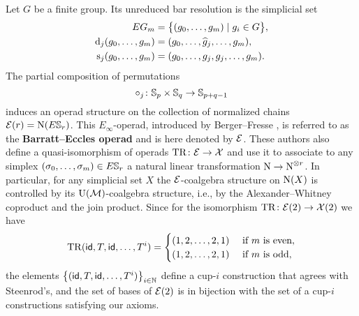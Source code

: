 Let $G$ be a finite group.
Its unreduced bar resolution is the simplicial set
\[
\begin{split}
EG_m &= \big\{ (g_0, \dots, g_m) \mid g_i \in G \big\}, \\
\operatorname{d}_j(g_0, \dots, g_m) &= (g_0, \dots, \widehat g_j, \dots, g_m), \\
\operatorname{s}_j(g_0, \dots, g_m) &= (g_0, \dots, g_j, g_j, \dots, g_m).
\end{split}
\]
The partial composition of permutations
\[
\circ_j \colon \mathbb{S}_p \times \mathbb{S}_q \to \mathbb{S}_{p+q-1}
\]
induces an operad structure on the collection of normalized chains $\mathcal{E}(r) = \operatorname{N}(E \mathbb{S}_r)$.
This $E_\infty$-operad, introduced by Berger--Fresse \cite{berger2004combinatorial}, is referred to as the \textbf{Barratt--Eccles operad} and is here denoted by $\mathcal{E}$.
These authors also define a quasi-isomorphism of operads $\mathrm{TR} \colon \mathcal{E} \to \mathcal{X}$ and use it to associate to any simplex $(\sigma_0, \dots, \sigma_m) \in E \mathbb{S}_r$ a natural linear transformation $\operatorname{N} \to \operatorname{N}^{\otimes r}$.
In particular, for any simplicial set $X$ the $\mathcal{E}$-coalgebra structure on $\operatorname{N}(X)$ is controlled by its ${\operatorname{U}(\mathcal{M})}$-coalgebra structure, i.e., by the Alexander--Whitney coproduct and the join product.
Since for the isomorphism $\mathrm{TR} \colon \mathcal{E}(2) \to \mathcal{X}(2)$ we have
\[
\mathrm{TR}(\mathsf{id}, T, \mathsf{id}, \dots, T^i) =
\begin{cases}
(1,2,\dots,2,1) & \text{ if } m \text{ is even}, \\
(1,2,\dots,2,1) & \text{ if } m \text{ is odd},
\end{cases}
\]
the elements $\big\{ (\mathsf{id}, T, \mathsf{id}, \dots, T^i) \big\}_{i \in \mathbb{N}}$ define a \mbox{cup-$i$} construction that agrees with Steenrod's, and the set of bases of $\mathcal{E}(2)$ is in bijection with the set of a \mbox{cup-$i$} constructions satisfying our axioms.